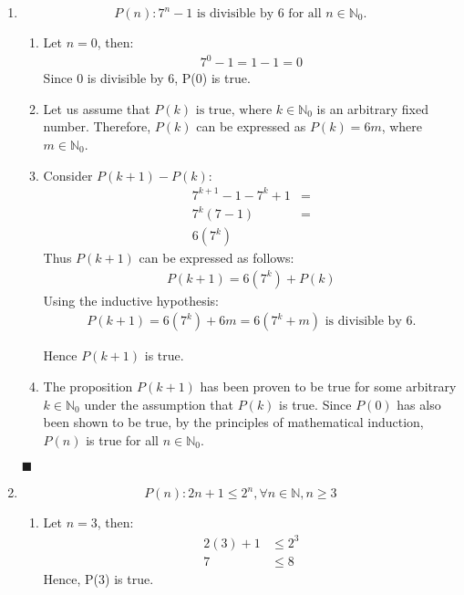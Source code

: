 \documentclass[12pt]{article}
\newcommand{\p}[1]{\item[\textnormal{(#1)}]}
\newcommand{\q}{\hfill $\blacksquare$}
\newenvironment{ps}
{\begin{enumerate}[leftmargin=0em, itemindent=1.5em]}
{\end{enumerate}}
\begin{document}
\begin{ps}
    \p{d} 
    \[
        P(n): 7^n - 1 \text{ is divisible by 6 for all } n \in \mathbb{N}_0.
    \]   

    \begin{enumerate}[label=\arabic*.]
        \item Let \( n = 0 \), then: 
        \begin{align*}
            7^0 - 1 = 1 - 1 = 0
        \end{align*}
        Since 0 is divisible by 6, P(0) is true.

    \item Let us assume that \( P(k) \text{ is true, where } k \in \mathbb{N}_0 \) is an arbitrary
        fixed number. Therefore, \( P(k) \) can be expressed as \( P(k) = 6m \), where \( m \in \mathbb{N}_0 \).

    \item Consider \( P(k+1) - P(k) \):
    \begin{align*}
        7^{k+1} - 1 - 7^k + 1 &= \\
        7^k (7-1) &= \\
        6(7^k)
    \end{align*}
    Thus \( P(k+1) \) can be expressed as follows:
    \begin{align*}
        P(k+1) = 6(7^k) + P(k)
    \end{align*}
    Using the inductive hypothesis: 
    \begin{align*}
        P(k+1) = 6(7^k) + 6m = 6(7^k + m) \text{ is divisible by 6.}
    \end{align*}

    Hence \( P(k+1) \) is true.

    \item The proposition \( P(k+1) \) has been proven to be true for some arbitrary \( k \in
        \mathbb{N}_0 \) under the assumption that \( P(k) \) is true. Since \( P(0) \) has also been
        shown to be true, by the principles of mathematical induction, \( P(n) \) is true for all \( n \in
        \mathbb{N}_0 \).

    \end{enumerate} \q

    \p{e}
    \[
        P(n): 2n + 1 \leq 2^n, \forall n \in \mathbb{N}, n \geq 3
    \]   
    \begin{enumerate}[label=\arabic*.]
        \item Let \( n = 3 \), then: 
        \begin{align*}
            2(3) + 1 &\leq 2^3 \\
            7 &\leq 8
        \end{align*}
        Hence, P(3) is true.


\end{enumerate}
\end{ps}
\end{document}
